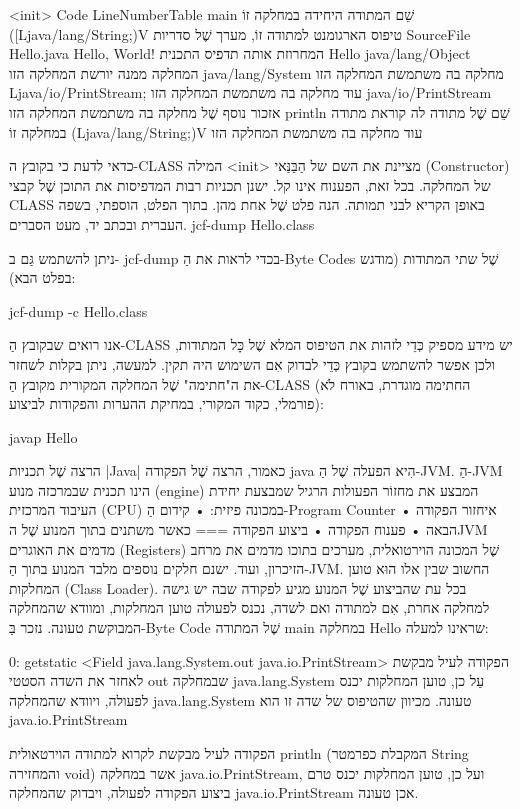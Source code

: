 <init>
Code
LineNumberTable
main שֵׁם המתודה היחידה במחלקה זוֹ
([Ljava/lang/String;)V טיפוס הארגומנט למתודה זוֹ, מערך שֶׁל
סדריות
SourceFile
Hello.java
Hello, World! המחרוזת אותה תדפיס התכנית
Hello
java/lang/Object המחלקה ממנה יורשת
המחלקה הזו
java/lang/System מחלקה בה משתמשת המחלקה
הזו
Ljava/io/PrintStream; עוד מחלקה בה משתמשת המחלקה
הזו
java/io/PrintStream אזכור נוסף שֶׁל מחלקה בה משתמשת
המחלקה הזו
println שֵׁם שֶׁל מתודה לה קוראת מתודה במחלקה זוֹ
(Ljava/lang/String;)V עוד מחלקה בה משתמשת המחלקה
הזו

כדאי לדעת כי בקובץ ה-CLASS המילה <init> מציינת את השם של הַבַּנַּאי
(Constructor) של המחלקה.
בכל זאת, הפענוח אינו קל. ישנן תכניות רבות המדפיסות את התוכן שֶׁל קבצי
CLASS באופן הקריא לבני תמותה. הנה פלט שֶׁל אחת מהן. בתוך הפלט, הוספתי, בשפה
העברית ובכתב יד, מעט הסברים.
jcf-dump Hello.class
\END

ניתן להשתמש גַּם ב- jcf-dump בכדי לראות את הַ-Byte Codes שֶׁל שתי המתודות
(מודגש בפלט הבא):

jcf-dump -c Hello.class
\END

אנו רואים שבקובץ הַ-CLASS יש מידע מספיק כְּדֵי לזהות את הטיפוס המלא שֶׁל כָּל
המתודות, ולכן אפשר להשתמש בקובץ כְּדֵי לבדוק אִם השימוש היה תקין. למעשה, ניתן
בקלות לשחזר את ה"חתימה" שֶׁל המחלקה המקורית מקובץ הַ-CLASS (החתימה
מוגדרת, באורח לֹא פורמלי, כקוד המקורי, במחיקת ההערות והפקודות לביצוע):

javap Hello
\END

הרצה שֶׁל תכניות \E|Java|
כאמור, הרצה שֶׁל הפקודה java הִיא הפעלה שֶׁל הַ-JVM. הַ-JVM הינו
תכנית שבמרכזה מנוע (engine) המבצע את מחזוֹר הפעולות הרגיל שמבצעת יחידת
העיבוד המרכזית (CPU) במכונה פיזית:
• קידום הַ-Program Counter
• איחזור הפקודה הבאה
• פענוח הפקודה
• ביצוע הפקודה
===
כאשר משתנים בתוך המנוע שֶׁל הJVM מדמים את האוגרים (Registers) שֶׁל המכונה
הוירטואלית, מערכים בתוכו מדמים את מרחב הזיכרון, ועוד.
ישנם חלקים נוספים מלבד המנוע בתוך הַ-JVM. החשוב שבין אלו הוּא טוען המחלקות
(Class Loader). בכל עת שהביצוע שֶׁל המנוע מגיע לפקודה שבה יש גישה למחלקה
אחרת, אִם למתודה ואם לשדה, נכנס לפעולה טוען המחלקות, ומוודא שהמחלקה
המבוקשת טעונה.
נזכר בַּ-Byte Code שֶׁל המתודה main במחלקה Hello שראינו למעלה:

  0: getstatic <Field java.lang.System.out java.io.PrintStream>
הפקודה לעיל מבקשת לאחזר את השדה הסטטי out שבמחלקה java.lang.System עַל כן,
טוען המחלקות יכנס לפעולה, ויוודא שהמחלקה java.lang.System טעונה. מכיוון
שהטיפוס של שדה זו הוא java.io.PrintStream

הפקודה לעיל מבקשת לקרוא למתודה הוירטאולית println (המקבלת כפרמטר String
והמחזירה void) אשר במחלקה java.io.PrintStream, ועל כן, טוען המחלקות
יכנס טרם ביצוע הפקודה לפעולה, ויבדוק שהמחלקה java.io.PrintStream אכן טעונה.

